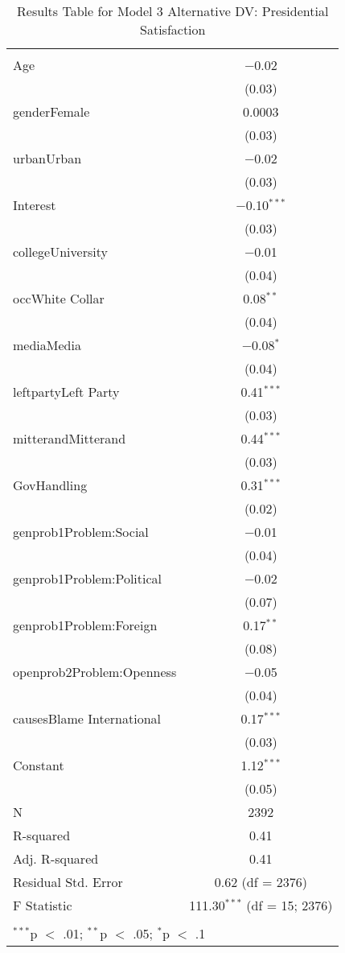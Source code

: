 
\begin{table}[!htbp] \centering 
  \caption{Results Table for Model 3 Alternative DV: Presidential Satisfaction} 
  \label{} 
\footnotesize 
\begin{tabular}{@{\extracolsep{5pt}}lc} 
\\[-1.8ex]\hline \\[-1.8ex] 
\hline \\[-1.8ex] 
 Age & $-$0.02 \\ 
  & (0.03) \\ 
  genderFemale & 0.0003 \\ 
  & (0.03) \\ 
  urbanUrban & $-$0.02 \\ 
  & (0.03) \\ 
  Interest & $-$0.10$^{***}$ \\ 
  & (0.03) \\ 
  collegeUniversity & $-$0.01 \\ 
  & (0.04) \\ 
  occWhite Collar & 0.08$^{**}$ \\ 
  & (0.04) \\ 
  mediaMedia & $-$0.08$^{*}$ \\ 
  & (0.04) \\ 
  leftpartyLeft Party & 0.41$^{***}$ \\ 
  & (0.03) \\ 
  mitterandMitterand & 0.44$^{***}$ \\ 
  & (0.03) \\ 
  GovHandling & 0.31$^{***}$ \\ 
  & (0.02) \\ 
  genprob1Problem:Social & $-$0.01 \\ 
  & (0.04) \\ 
  genprob1Problem:Political & $-$0.02 \\ 
  & (0.07) \\ 
  genprob1Problem:Foreign & 0.17$^{**}$ \\ 
  & (0.08) \\ 
  openprob2Problem:Openness & $-$0.05 \\ 
  & (0.04) \\ 
  causesBlame International & 0.17$^{***}$ \\ 
  & (0.03) \\ 
  Constant & 1.12$^{***}$ \\ 
  & (0.05) \\ 
 N & 2392 \\ 
R-squared & 0.41 \\ 
Adj. R-squared & 0.41 \\ 
Residual Std. Error & 0.62 (df = 2376) \\ 
F Statistic & 111.30$^{***}$ (df = 15; 2376) \\ 
\hline \\[-1.8ex] 
\multicolumn{2}{l}{$^{***}$p $<$ .01; $^{**}$p $<$ .05; $^{*}$p $<$ .1} \\ 
\end{tabular} 
\end{table} 
